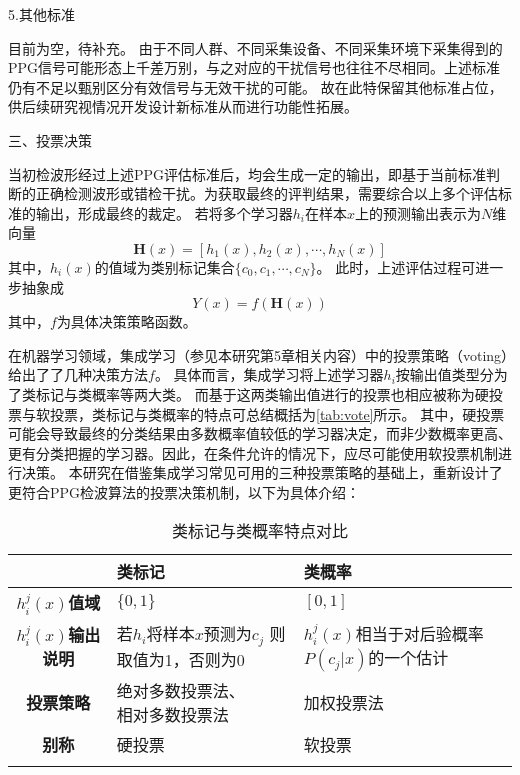 5.其他标准

目前为空，待补充。
由于不同人群、不同采集设备、不同采集环境下采集得到的PPG信号可能形态上千差万别，与之对应的干扰信号也往往不尽相同。上述标准仍有不足以甄别区分有效信号与无效干扰的可能。
故在此特保留其他标准占位，供后续研究视情况开发设计新标准从而进行功能性拓展。

三、投票决策

当初检波形经过上述PPG评估标准后，均会生成一定的输出，即基于当前标准判断的正确检测波形或错检干扰。为获取最终的评判结果，需要综合以上多个评估标准的输出，形成最终的裁定。
若将多个学习器$h_i$在样本$x$上的预测输出表示为$N$维向量
\begin{equation}
    \label{equ:vector_h}
    \boldsymbol H(x) = [h_1(x),h_2(x),\cdots,h_N(x)]
\end{equation}
其中，$h_i(x)$的值域为类别标记集合$\{c_0,c_1,\cdots,c_N\}$。
此时，上述评估过程可进一步抽象成
\begin{equation}
    \label{equ:output_h}
    Y(x) = f(\boldsymbol H(x))
\end{equation}
其中，$f$为具体决策策略函数。

在机器学习领域，集成学习（参见本研究第5章相关内容）中的投票策略（voting）给出了了几种决策方法$f$\cite{Zhou2016}。
具体而言，集成学习将上述学习器$h_i$按输出值类型分为了类标记与类概率等两大类。
而基于这两类输出值进行的投票也相应被称为硬投票与软投票，类标记与类概率的特点可总结概括为\autoref{tab:vote}所示。
其中，硬投票可能会导致最终的分类结果由多数概率值较低的学习器决定，而非少数概率更高、更有分类把握的学习器。因此，在条件允许的情况下，应尽可能使用软投票机制进行决策。
本研究在借鉴集成学习常见可用的三种投票策略的基础上\cite{Kittler1998,Zhou2016}，重新设计了更符合PPG检波算法的投票决策机制，以下为具体介绍：
\begin{table}[htbp]
    \centering
    \caption{\label{tab:vote}类标记与类概率特点对比}
    \begin{tabularx}{\linewidth}{c|X<{\centering}X<{\centering}}
        \Xhline{1pt} 
            &\textbf{类标记}&\textbf{类概率}\\
        \hline
        \textbf{$h_i^j(x)$值域}  &$\{0,1\}$    &$[0,1]$     \\
        \textbf{$h_i^j(x)$输出说明}&\tabincell{c}{若$h_i$将样本$x$预测为$c_j$\\则取值为1，否则为0}&\tabincell{c}{$h_i^j(x)$相当于对后验概率\\$P(c_j|x)$的一个估计}\\
        \textbf{投票策略}&\tabincell{c}{绝对多数投票法、\\相对多数投票法}&加权投票法\\
        \textbf{别称}    &硬投票 &软投票 \\
        \Xhline{1pt}
    \end{tabularx}
\end{table}

